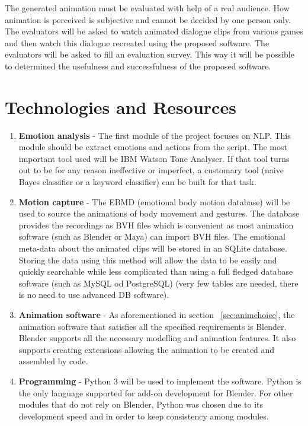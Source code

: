 The generated animation must be evaluated with help of a real audience. How animation is perceived is subjective and cannot be decided by one person only. The evaluators will be asked to watch animated dialogue clips from various games and then watch this dialogue recreated using the proposed software. The evaluators will be asked to fill an evaluation survey. This way it will be possible to determined the usefulness and successfulness of the proposed software.


\section{Technologies and Resources}

\begin{enumerate}
\item \textbf{Emotion analysis} - The first module of the project focuses on NLP. This module should be extract emotions and actions from the script. The most important tool used will be IBM Watson Tone Analyser. If that tool turns out to be for any reason ineffective or imperfect, a customary tool (naive Bayes classifier or a keyword classifier) can be built for that task.

\item \textbf{Motion capture} - The EBMD (emotional body motion database) will be used to source the animations of body movement and gestures. The database provides the recordings as BVH files which is convenient as most animation software (such as Blender or Maya) can import BVH files. The emotional meta-data about the animated clips will be stored in an SQLite database. Storing the data using this method will allow the data to be easily and quickly searchable while less complicated than using a full fledged database software (such as MySQL od PostgreSQL) (very few tables are needed, there is no need to use advanced DB software).

\item \textbf{Animation software} - As aforementioned in section ~\ref{sec:animchoice}, the animation software that satisfies all the specified requirements is Blender. Blender supports all the necessary modelling and animation features. It also supports creating extensions allowing the animation to be created and assembled by code.

\item \textbf{Programming} - Python 3 will be used to implement the software. Python is the only language supported for add-on development for Blender. For other modules that do not rely on Blender, Python was chosen due to its development speed and in order to keep consistency among modules.

\end{enumerate}

